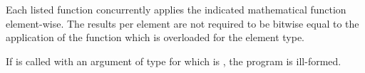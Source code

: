 

\pnum Each listed function concurrently applies the indicated mathematical function element-wise.
The results per element are not required to be bitwise equal to the application of the function which is overloaded for the element type.

\pnum If  is called with an argument of type \simd[<X, Abi>] for which  is \true, the program is ill-formed.

